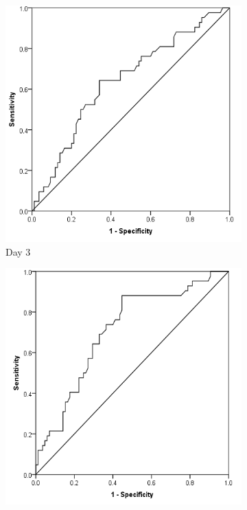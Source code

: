 \clearpage
\begin{figure}[t]
	\caption{Receiver operating characteristics curve analysis of C-reactive protein as a marker of postoperative infective complications.}
	\label{fig:crp_comp_ROC_infection}

	\centering
	\begin{subfigure}{0.3\textwidth}
		\centering
		\includegraphics[width=\textwidth]{Figures/crp_comp_ROC_infection_D3}
		\caption{Day 3}
		\label{fig:crp_comp_ROC_infection_D3}
	\end{subfigure}
	\hfill
	\begin{subfigure}{0.3\textwidth}
		\centering
		\includegraphics[width=\textwidth]{Figures/crp_comp_ROC_infection_D4}

\end{subfigure}
\end{figure}
